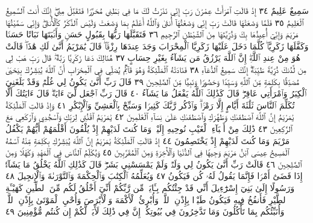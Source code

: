 سَمِيعٌ عَلِيمٌ ٣٤ إِذْ قَالَتِ ٱمْرَأَتُ عِمْرَٰنَ رَبِّ إِنِّي نَذَرْتُ لَكَ
مَا فِي بَطْنِي مُحَرَّرࣰا فَتَقَبَّلْ مِنِّيٓۖ إِنَّكَ أَنتَ ٱلسَّمِيعُ ٱلْعَلِيمُ ٣٥
فَلَمَّا وَضَعَتْهَا قَالَتْ رَبِّ إِنِّي وَضَعْتُهَآ أُنثَىٰ وَٱللَّهُ أَعْلَمُ بِمَا وَضَعَتْ
وَلَيْسَ ٱلذَّكَرُ كَٱلْأُنثَىٰۖ وَإِنِّي سَمَّيْتُهَا مَرْيَمَ وَإِنِّيٓ أُعِيذُهَا بِكَ
وَذُرِّيَّتَهَا مِنَ ٱلشَّيْطَٰنِ ٱلرَّجِيمِ ٣٦ فَتَقَبَّلَهَا رَبُّهَا بِقَبُولٍ
حَسَنࣲ وَأَنۢبَتَهَا نَبَاتًا حَسَنࣰا وَكَفَّلَهَا زَكَرِيَّاۖ كُلَّمَا دَخَلَ عَلَيْهَا
زَكَرِيَّا ٱلْمِحْرَابَ وَجَدَ عِندَهَا رِزْقࣰاۖ قَالَ يَٰمَرْيَمُ أَنَّىٰ لَكِ هَٰذَاۖ
قَالَتْ هُوَ مِنْ عِندِ ٱللَّهِۖ إِنَّ ٱللَّهَ يَرْزُقُ مَن يَشَآءُ بِغَيْرِ حِسَابٍ ٣٧
هُنَالِكَ دَعَا زَكَرِيَّا رَبَّهُۥۖ قَالَ رَبِّ هَبْ لِي مِن لَّدُنكَ ذُرِّيَّةࣰ
طَيِّبَةًۖ إِنَّكَ سَمِيعُ ٱلدُّعَآءِ ٣٨ فَنَادَتْهُ ٱلْمَلَٰٓئِكَةُ وَهُوَ قَآئِمࣱ
يُصَلِّي فِي ٱلْمِحْرَابِ أَنَّ ٱللَّهَ يُبَشِّرُكَ بِيَحْيَىٰ مُصَدِّقَۢا بِكَلِمَةࣲ
مِّنَ ٱللَّهِ وَسَيِّدࣰا وَحَصُورࣰا وَنَبِيࣰّا مِّنَ ٱلصَّٰلِحِينَ ٣٩ قَالَ رَبِّ
أَنَّىٰ يَكُونُ لِي غُلَٰمࣱ وَقَدْ بَلَغَنِيَ ٱلْكِبَرُ وَٱمْرَأَتِي عَاقِرࣱۖ قَالَ
كَذَٰلِكَ ٱللَّهُ يَفْعَلُ مَا يَشَآءُ ٤٠ قَالَ رَبِّ ٱجْعَل لِّيٓ ءَايَةࣰۖ
قَالَ ءَايَتُكَ أَلَّا تُكَلِّمَ ٱلنَّاسَ ثَلَٰثَةَ أَيَّامٍ إِلَّا رَمْزࣰاۗ وَٱذْكُر
رَّبَّكَ كَثِيرࣰا وَسَبِّحْ بِٱلْعَشِيِّ وَٱلْإِبْكَٰرِ ٤١ وَإِذْ قَالَتِ
ٱلْمَلَٰٓئِكَةُ يَٰمَرْيَمُ إِنَّ ٱللَّهَ ٱصْطَفَىٰكِ وَطَهَّرَكِ وَٱصْطَفَىٰكِ
عَلَىٰ نِسَآءِ ٱلْعَٰلَمِينَ ٤٢ يَٰمَرْيَمُ ٱقْنُتِي لِرَبِّكِ وَٱسْجُدِي
وَٱرْكَعِي مَعَ ٱلرَّٰكِعِينَ ٤٣ ذَٰلِكَ مِنْ أَنۢبَآءِ ٱلْغَيْبِ نُوحِيهِ إِلَيْكَۚ
وَمَا كُنتَ لَدَيْهِمْ إِذْ يُلْقُونَ أَقْلَٰمَهُمْ أَيُّهُمْ يَكْفُلُ مَرْيَمَ
وَمَا كُنتَ لَدَيْهِمْ إِذْ يَخْتَصِمُونَ ٤٤ إِذْ قَالَتِ ٱلْمَلَٰٓئِكَةُ
يَٰمَرْيَمُ إِنَّ ٱللَّهَ يُبَشِّرُكِ بِكَلِمَةࣲ مِّنْهُ ٱسْمُهُ ٱلْمَسِيحُ عِيسَى
ٱبْنُ مَرْيَمَ وَجِيهࣰا فِي ٱلدُّنْيَا وَٱلْأٓخِرَةِ وَمِنَ ٱلْمُقَرَّبِينَ ٤٥
وَيُكَلِّمُ ٱلنَّاسَ فِي ٱلْمَهْدِ وَكَهْلࣰا وَمِنَ ٱلصَّٰلِحِينَ ٤٦
قَالَتْ رَبِّ أَنَّىٰ يَكُونُ لِي وَلَدࣱ وَلَمْ يَمْسَسْنِي بَشَرࣱۖ قَالَ كَذَٰلِكِ
ٱللَّهُ يَخْلُقُ مَا يَشَآءُۚ إِذَا قَضَىٰٓ أَمْرࣰا فَإِنَّمَا يَقُولُ لَهُۥ كُن فَيَكُونُ ٤٧
وَيُعَلِّمُهُ ٱلْكِتَٰبَ وَٱلْحِكْمَةَ وَٱلتَّوْرَىٰةَ وَٱلْإِنجِيلَ ٤٨
وَرَسُولًا إِلَىٰ بَنِيٓ إِسْرَٰٓءِيلَ أَنِّي قَدْ جِئْتُكُم بِـَٔايَةࣲ مِّن
رَّبِّكُمْ أَنِّيٓ أَخْلُقُ لَكُم مِّنَ ٱلطِّينِ كَهَيْـَٔةِ ٱلطَّيْرِ فَأَنفُخُ
فِيهِ فَيَكُونُ طَيْرَۢا بِإِذْنِ ٱللَّهِۖ وَأُبْرِئُ ٱلْأَكْمَهَ وَٱلْأَبْرَصَ
وَأُحْيِ ٱلْمَوْتَىٰ بِإِذْنِ ٱللَّهِۖ وَأُنَبِّئُكُم بِمَا تَأْكُلُونَ وَمَا تَدَّخِرُونَ
فِي بُيُوتِكُمْۚ إِنَّ فِي ذَٰلِكَ لَأٓيَةࣰ لَّكُمْ إِن كُنتُم مُّؤْمِنِينَ ٤٩
